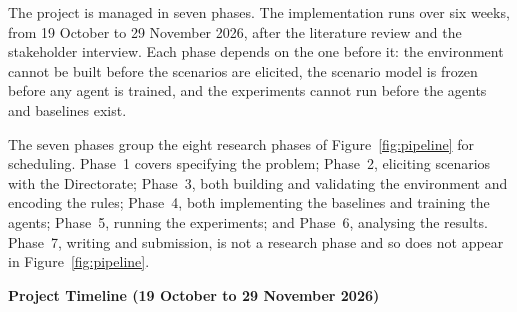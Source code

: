 The project is managed in seven phases. The implementation runs over six weeks, from 19 October to 29 November 2026, after the literature review and the stakeholder interview. Each phase depends on the one before it: the environment cannot be built before the scenarios are elicited, the scenario model is frozen before any agent is trained, and the experiments cannot run before the agents and baselines exist.

The seven phases group the eight research phases of Figure~\ref{fig:pipeline} for scheduling. Phase~1 covers specifying the problem; Phase~2, eliciting scenarios with the Directorate; Phase~3, both building and validating the environment and encoding the rules; Phase~4, both implementing the baselines and training the agents; Phase~5, running the experiments; and Phase~6, analysing the results. Phase~7, writing and submission, is not a research phase and so does not appear in Figure~\ref{fig:pipeline}.

\begin{center}\textbf{Project Timeline (19 October to 29 November 2026)}\end{center}

